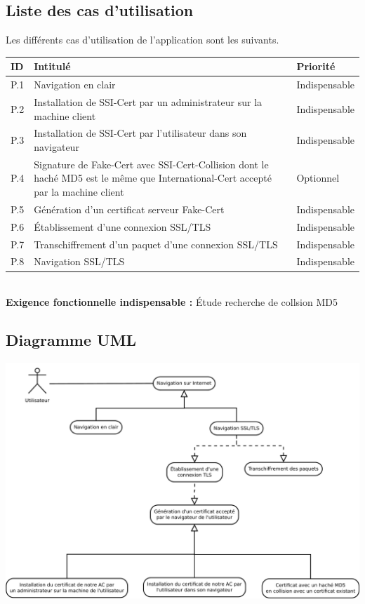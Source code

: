 \documentclass[a4paper,11pt,french]{article}
\begin{document}
\subsection{Liste des cas d'utilisation}

Les différents cas d'utilisation de l'application sont les suivants.

\begin{center}
\begin{tabular}{|l|m{12cm}|l|}
\hline 
\rowcolor[gray]{.8} ID & Intitulé & Priorité \\ 
\hline
P.1 & Navigation en clair & Indispensable\\
\hline
P.2 & Installation de SSI-Cert par un administrateur sur la machine client  & Indispensable \\ 
 \hline 
P.3 & Installation de SSI-Cert par l'utilisateur dans son navigateur
 & Indispensable \\ 
\hline 
P.4 & Signature de Fake-Cert avec SSI-Cert-Collision dont le haché MD5 est le même que International-Cert accepté par la machine client & Optionnel \\
\hline
P.5 & Génération d'un certificat serveur Fake-Cert & Indispensable \\ 
\hline
P.6 & Établissement d'une connexion SSL/TLS & Indispensable \\
\hline
P.7 & Transchiffrement d'un paquet d'une connexion SSL/TLS & Indispensable \\
\hline
P.8 & Navigation SSL/TLS & Indispensable \\ 
\hline

 

\end{tabular} 
\end{center}
~~\\
\textbf{Exigence fonctionnelle indispensable :} Étude recherche de collsion MD5
~~\\

\huge
\subsection{Diagramme UML}
\begin{center}
\includegraphics[width=\textwidth]{images/cas_utilisation.pdf}
\end{center}
\normalsize
\end{document}
